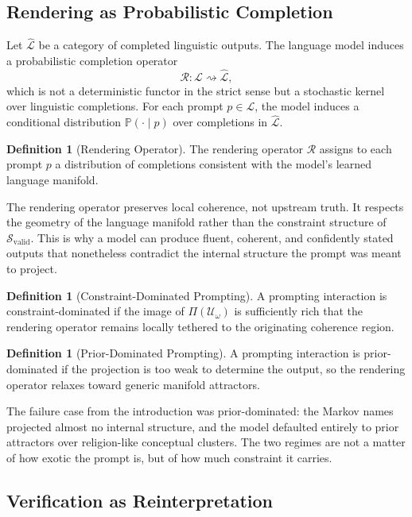 \documentclass[12pt, a4paper]{article}
\theoremstyle{plain}
\theoremstyle{definition}
\newtheorem{definition}[theorem]{Definition}
\theoremstyle{remark}
\begin{document}
\subsection{Rendering as Probabilistic Completion}

Let $\widehat{\mathcal{L}}$ be a category of completed linguistic outputs. The language model induces a probabilistic completion operator
\[
\mathcal{R} : \mathcal{L} \rightsquigarrow \widehat{\mathcal{L}},
\]
which is not a deterministic functor in the strict sense but a stochastic kernel over linguistic completions. For each prompt $p \in \mathcal{L}$, the model induces a conditional distribution $\mathbb{P}(\cdot \mid p)$ over completions in $\widehat{\mathcal{L}}$.

\begin{definition}[Rendering Operator]
The rendering operator $\mathcal{R}$ assigns to each prompt $p$ a distribution of completions consistent with the model's learned language manifold.
\end{definition}

The rendering operator preserves local coherence, not upstream truth. It respects the geometry of the language manifold rather than the constraint structure of $\mathcal{S}_{\mathrm{valid}}$. This is why a model can produce fluent, coherent, and confidently stated outputs that nonetheless contradict the internal structure the prompt was meant to project.

\begin{definition}[Constraint-Dominated Prompting]
A prompting interaction is constraint-dominated if the image of $\Pi(\mathcal{U}_\omega)$ is sufficiently rich that the rendering operator remains locally tethered to the originating coherence region.
\end{definition}

\begin{definition}[Prior-Dominated Prompting]
A prompting interaction is prior-dominated if the projection is too weak to determine the output, so the rendering operator relaxes toward generic manifold attractors.
\end{definition}

The failure case from the introduction was prior-dominated: the Markov names projected almost no internal structure, and the model defaulted entirely to prior attractors over religion-like conceptual clusters. The two regimes are not a matter of how exotic the prompt is, but of how much constraint it carries.

\subsection{Verification as Reinterpretation}
\end{document}
